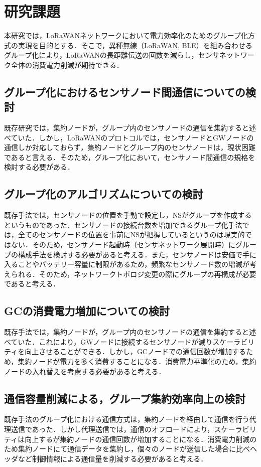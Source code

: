 \chapter{研究課題}
本研究では，LoRaWANネットワークにおいて電力効率化のためのグループ化方式の実現を目的とする．そこで，異種無線（LoRaWAN, BLE）を組み合わせるグループ化により，LoRaWANの長距離伝送の回数を減らし，センサネットワーク全体の消費電力削減が期待できる．

\section{グループ化におけるセンサノード間通信についての検討}
既存研究\cite{Obana2018}では，集約ノードが，グループ内のセンサノードの通信を集約すると述べていた．しかし，LoRaWANのプロトコルでは，センサノードとGWノードの通信しか対応しておらず，集約ノードとグループ内のセンサノードは，現状困難であると言える．そのため，グループ化において，センサノード間通信の規格を検討する必要がある．

\section{グループ化のアルゴリズムについての検討}
既存手法\cite{Obana2018}では，センサノードの位置を手動で設定し，NSがグループを作成するというものであった．センサノードの接続台数を増加できるグループ化手法では，全てのセンサノードの位置を事前にNSが把握しているというのは現実的ではない．そのため，センサノード起動時（センサネットワーク展開時）にグループの構成手法を検討する必要があると考える．また，センサノードは安価で手に入ることやバッテリー容量に制限があるため，頻繁なセンサノード数の増減が考えられる．そのため，ネットワークトポロジ変更の際にグループの再構成が必要であると考える．

\section{GCの消費電力増加についての検討}
既存手法\cite{Obana2018}では，集約ノードが，グループ内のセンサノードの通信を集約すると述べていた．これにより，GWノードに接続するセンサノードが減りスケーラビリティを向上させることができる．しかし，GCノードでの通信回数が増加するため，集約ノードが電力を多く消費することになる．消費電力平準化のため，集約ノードの入れ替えを考慮する必要があると考える．

\section{通信容量削減による，グループ集約効率向上の検討}
既存手法\cite{Obana2018}のグループ化における通信方式は，集約ノードを経由して通信を行う代理送信であった．しかし代理送信では，通信のオフロードにより，スケーラビリティは向上するが集約ノードの通信回数が増加することになる．消費電力削減のため集約ノードにて通信データを集約し，個々のノードが送信した場合に比べヘッダなど制御情報による通信量を削減する必要があると考える．

